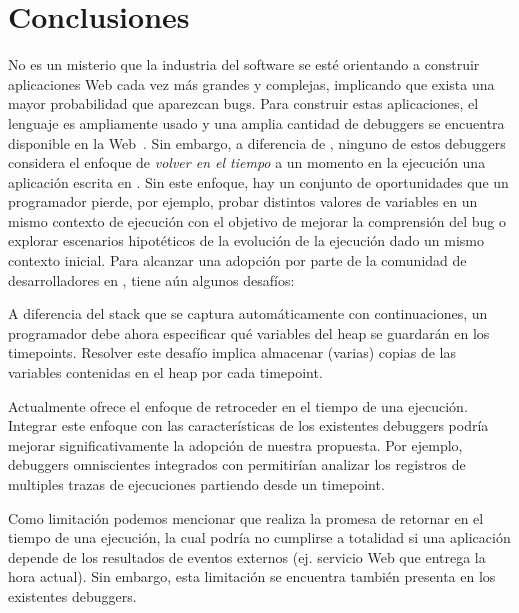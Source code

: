 \documentclass[conference]{IEEEtran}
\begin{document}
\section{Conclusiones}
\label{sec:conc}

No es un misterio que la industria del software se est\'e orientando a construir aplicaciones Web cada vez m\'as grandes y complejas, implicando que exista una mayor probabilidad que aparezcan bugs. Para construir estas aplicaciones, el lenguaje \javascript es ampliamente usado y una amplia cantidad de debuggers se encuentra disponible en la Web~\cite{bartonOdvarko:www2011,jsbin,nodejsInspector,sessionstack,raygun,trackjs,azar:2016,barrAl:fse2016}. Sin embargo, a diferencia de \deloreanjs, ninguno de estos debuggers considera el enfoque de {\em volver en el tiempo} a un momento en la ejecuci\'on una aplicaci\'on escrita en \javascript. Sin este enfoque, hay un conjunto de oportunidades que un programador pierde, por ejemplo, probar distintos valores de variables en un mismo contexto de ejecuci\'on con el objetivo de mejorar la comprensi\'on del bug o explorar escenarios hipot\'eticos de la evoluci\'on de la ejecuci\'on dado un mismo contexto inicial. Para alcanzar una adopci\'on por parte de la comunidad de desarrolladores en \javascript, \deloreanjs tiene a\'un algunos desaf\'ios:  
   
\smallskip

 A diferencia del stack que se captura autom\'aticamente con continuaciones, un programador debe ahora especificar qu\'e variables del heap se guardar\'an en los timepoints. Resolver este desaf\'io implica almacenar (varias) copias de las variables contenidas en el heap por cada timepoint.      

\smallskip

 Actualmente \deloreanjs ofrece el enfoque de retroceder en el tiempo de una ejecuci\'on. Integrar este enfoque con las caracter\'isticas de los existentes debuggers podr\'ia mejorar significativamente la adopci\'on de nuestra propuesta. Por ejemplo, debuggers omniscientes integrados con \deloreanjs permitir\'ian analizar los registros de multiples trazas de ejecuciones partiendo desde un timepoint.

\smallskip

Como limitaci\'on podemos mencionar que \deloreanjs realiza la promesa de retornar en el tiempo de una ejecuci\'on, la cual podr\'ia no cumplirse a totalidad si una aplicaci\'on depende de los resultados de eventos externos (ej. servicio Web que entrega la hora actual). Sin embargo, esta limitaci\'on se encuentra tambi\'en presenta en los existentes debuggers.               



\end{document}
